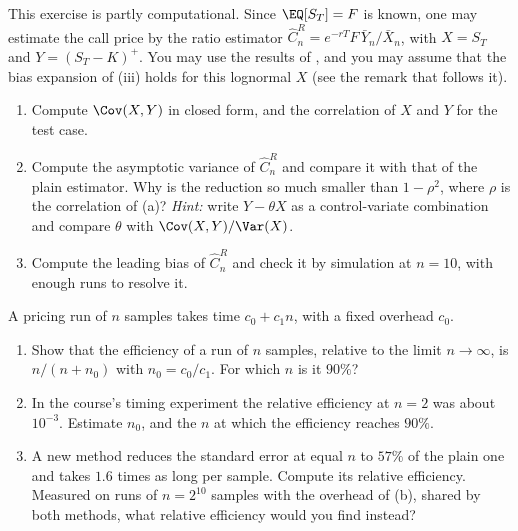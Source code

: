 \begin{exercise}\label{ex:mc-ratio}
\medium This exercise is partly computational. Since $\EQ[S_T]=F$ is known, one may
estimate the call price by the ratio estimator
$\hat C^{R}_n=e^{-rT}F\,\bar Y_n/\bar X_n$, with $X=S_T$ and $Y=(S_T-K)^+$. You may use the
results of , and you may assume that the bias expansion of
(iii) holds for this lognormal $X$ (see the remark that follows it).
\begin{enumerate}[label=(\alph*)]
  \item Compute $\Cov(X,Y)$ in closed form, and the correlation of $X$ and $Y$ for the test
    case.
  \item Compute the asymptotic variance of $\hat C^R_n$ and compare it with that of the
    plain estimator. Why is the reduction so much smaller than $1-\rho^2$, where $\rho$ is
    the correlation of (a)? \emph{Hint:} write $Y-\theta X$ as a control-variate
    combination and compare $\theta$ with $\Cov(X,Y)/\Var(X)$.
  \item Compute the leading bias of $\hat C^R_n$ and check it by simulation at $n=10$, with
    enough runs to resolve it.
\end{enumerate}
\end{exercise}

\begin{exercise}\label{ex:mc-overhead}
\easy A pricing run of $n$ samples takes time $c_0+c_1n$, with a fixed overhead $c_0$.
\begin{enumerate}[label=(\alph*)]
  \item Show that the efficiency of a run of $n$ samples, relative to the limit
    $n\to\infty$, is $n/(n+n_0)$ with $n_0=c_0/c_1$. For which $n$ is it $90\%$?
  \item In the course's timing experiment the relative efficiency at $n=2$ was about
    $10^{-3}$. Estimate $n_0$, and the $n$ at which the efficiency reaches $90\%$.
  \item A new method reduces the standard error at equal $n$ to $57\%$ of the plain one and
    takes $1.6$ times as long per sample. Compute its relative efficiency. Measured on runs
    of $n=2^{10}$ samples with the overhead of (b), shared by both methods, what relative
    efficiency would you find instead?
\end{enumerate}
\end{exercise}

